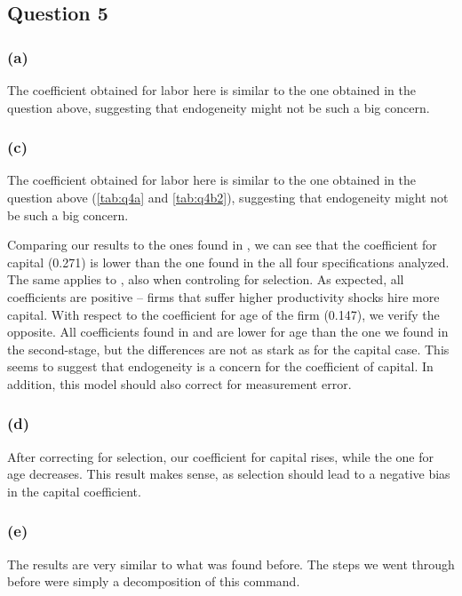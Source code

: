 \documentclass[11pt]{article}
\begin{document}
\FloatBarrier

\subsection*{Question 5} \label{q5}
\subsubsection*{(a)}
The coefficient obtained for labor here is similar to the one obtained in the question above, suggesting that endogeneity might not be such a big concern. 

\FloatBarrier


\subsubsection*{(c)}


\FloatBarrier
The coefficient obtained for labor here is similar to the one obtained in the question above (\autoref{tab:q4a} and \autoref{tab:q4b2}), suggesting that endogeneity might not be such a big concern. 

\FloatBarrier
Comparing our results to the ones found in , we can see that the coefficient for capital (0.271) is lower than the one found in the all four specifications analyzed. The same applies to , also when controling for selection. As expected, all coefficients are positive -- firms that suffer higher productivity shocks hire more capital. 
With respect to the coefficient for age of the firm (0.147), we verify the opposite. All coefficients found in  and  are lower for age than the one we found in the second-stage, but the differences are not as stark as for the capital case. 
This seems to suggest that endogeneity is a concern for the coefficient of capital. In addition, this model should also correct for measurement error.  
\newpage
\subsubsection*{(d)}


\FloatBarrier
After correcting for selection, our coefficient for capital rises, while the one for age decreases. 
This result makes sense, as selection should lead to a negative bias in the capital coefficient. 

\subsubsection*{(e)}

\FloatBarrier

The results are very similar to what was found before. The steps we went through before were simply a decomposition of this command.  
\end{document}
